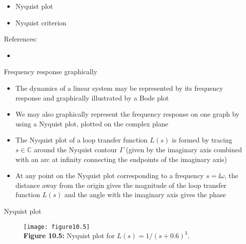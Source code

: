 \documentclass{beamer-control}
\begin{document}

\begin{SUMMARY}
\begin{itemize}
\item Nyquist plot
\item Nyquist criterion
\end{itemize}
\vfill References:
\begin{itemize}
\item {}
\end{itemize}
\end{SUMMARY}




\begin{frame}{Frequency response graphically}
\begin{itemize}
\item The dynamics of a linear system may be represented by its frequency response and graphically illustrated by a Bode plot
\item We may also graphically represent the frequency response on one graph by using a Nyquist plot, plotted on the complex plane
\item The Nyquist plot of a loop transfer function $L(s)$ is formed by tracing $s\in\mathbb{C}$ around the Nyquist contour $\Gamma$ (given by the imaginary axis combined with an arc at infinity connecting the endpoints of the imaginary axis)
\item At any point on the Nyquist plot corresponding to a frequency $s=\ii\omega$, the distance away from the origin gives the magnitude of the loop transfer function $L(s)$ and the angle with the imaginary axis gives the phase
\end{itemize}
\end{frame}


\begin{frame}{Nyquist plot}
\begin{figure}
	\centering
	\texttt{[image: figure10.5]}
	\\
	\textbf{Figure 10.5:} Nyquist plot for $L(s) = {1}/{(s+0.6)^3}$.
\end{figure}
\end{frame}


\end{document}
